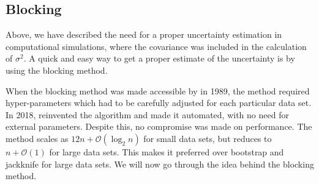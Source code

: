 \subsection{Blocking}\label{sec:resampling}
Above, we have described the need for a proper uncertainty estimation in computational simulations, where the covariance was included in
the calculation of $\sigma^2$. A quick and easy way to get a proper estimate of the uncertainty is by using the blocking method.

When the blocking method was made accessible by \citet{flyvbjerg_error_1989} in 1989, the method required hyper-parameters which had to be carefully adjusted for each particular data set. In 2018, \citet{jonsson_standard_2018} reinvented the algorithm and made it automated, with no need for external parameters. Despite this, no compromise was made on performance. The method scales as $12n+\mathcal{O}(\log_2n)$ for small data sets, but reduces to $n+\mathcal{O}(1)$ for large data sets.  This makes it preferred over bootstrap and jackknife for large data sets. We will now go through the idea behind the blocking method.

